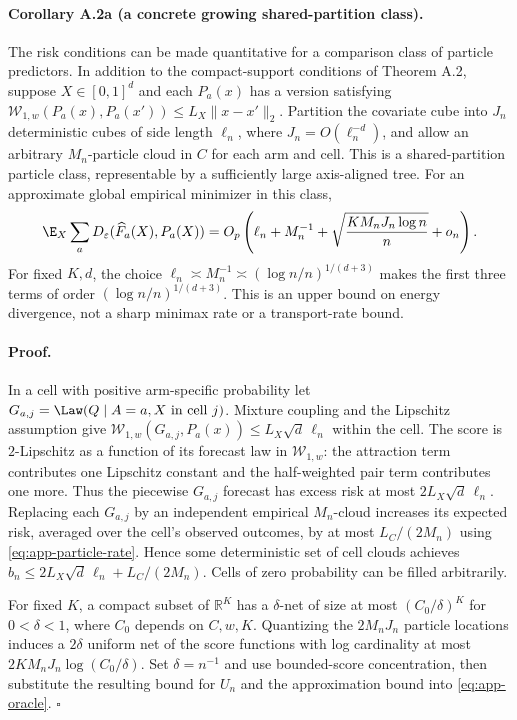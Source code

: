 \paragraph{Corollary A.2a (a concrete growing shared-partition class).}
The risk conditions can be made quantitative for a comparison class of particle predictors. In addition to the compact-support conditions of Theorem A.2, suppose $X\in[0,1]^d$ and each $P_a(x)$ has a version satisfying $\mathcal W_{1,w}(P_a(x),P_a(x'))\leq L_X\|x-x'\|_2$. Partition the covariate cube into $J_n$ deterministic cubes of side length $\ell_n$, where $J_n=O(\ell_n^{-d})$, and allow an arbitrary $M_n$-particle cloud in $C$ for each arm and cell. This is a shared-partition particle class, representable by a sufficiently large axis-aligned tree. For an approximate global empirical minimizer in this class,
\begin{equation}
 \E_X\sum_aD_\varepsilon(\widehat F_a(X),P_a(X))
 =O_p\left(\ell_n+M_n^{-1}
 +\sqrt{\frac{K M_nJ_n\log n}{n}}+o_n\right).
 \label{eq:app-sieve-rate}
\end{equation}
For fixed $K,d$, the choice $\ell_n\asymp M_n^{-1}\asymp(\log n/n)^{1/(d+3)}$ makes the first three terms of order $(\log n/n)^{1/(d+3)}$. This is an upper bound on energy divergence, not a sharp minimax rate or a transport-rate bound.

\paragraph{Proof.}
In a cell with positive arm-specific probability let $G_{a,j}=\Law(Q\mid A=a,X\text{ in cell }j)$. Mixture coupling and the Lipschitz assumption give $\mathcal W_{1,w}(G_{a,j},P_a(x))\leq L_X\sqrt d\,\ell_n$ within the cell. The score is $2$-Lipschitz as a function of its forecast law in $\mathcal W_{1,w}$: the attraction term contributes one Lipschitz constant and the half-weighted pair term contributes one more. Thus the piecewise $G_{a,j}$ forecast has excess risk at most $2L_X\sqrt d\,\ell_n$. Replacing each $G_{a,j}$ by an independent empirical $M_n$-cloud increases its expected risk, averaged over the cell's observed outcomes, by at most $L_C/(2M_n)$ using \eqref{eq:app-particle-rate}. Hence some deterministic set of cell clouds achieves $b_n\leq2L_X\sqrt d\,\ell_n+L_C/(2M_n)$. Cells of zero probability can be filled arbitrarily.

For fixed $K$, a compact subset of $\mathbb R^K$ has a $\delta$-net of size at most $(C_0/\delta)^K$ for $0<\delta<1$, where $C_0$ depends on $C,w,K$. Quantizing the $2M_nJ_n$ particle locations induces a $2\delta$ uniform net of the score functions with log cardinality at most $2KM_nJ_n\log(C_0/\delta)$. Set $\delta=n^{-1}$ and use bounded-score concentration, then substitute the resulting bound for $U_n$ and the approximation bound into \eqref{eq:app-oracle}. $\square$

